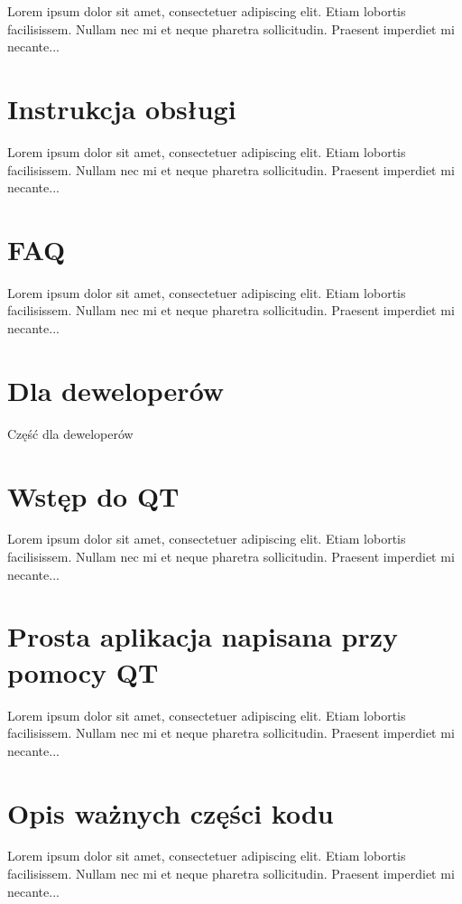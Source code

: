 \documentclass{article}
\begin{document}
Lorem ipsum dolor sit amet, consectetuer adipiscing elit.  
Etiam lobortis facilisissem.  Nullam nec mi et neque pharetra 
sollicitudin.  Praesent imperdiet mi necante...

\section{Instrukcja obsługi}
 
Lorem ipsum dolor sit amet, consectetuer adipiscing elit.  
Etiam lobortis facilisissem.  Nullam nec mi et neque pharetra 
sollicitudin.  Praesent imperdiet mi necante...

\section{FAQ}
 
Lorem ipsum dolor sit amet, consectetuer adipiscing elit.  
Etiam lobortis facilisissem.  Nullam nec mi et neque pharetra 
sollicitudin.  Praesent imperdiet mi necante...

\section*{Dla deweloperów}
 
Część dla deweloperów

\section{Wstęp do QT}
 
Lorem ipsum dolor sit amet, consectetuer adipiscing elit.  
Etiam lobortis facilisissem.  Nullam nec mi et neque pharetra 
sollicitudin.  Praesent imperdiet mi necante...

\section{Prosta aplikacja napisana przy pomocy QT}
 
Lorem ipsum dolor sit amet, consectetuer adipiscing elit.  
Etiam lobortis facilisissem.  Nullam nec mi et neque pharetra 
sollicitudin.  Praesent imperdiet mi necante...

\section{Opis ważnych części kodu}
 
Lorem ipsum dolor sit amet, consectetuer adipiscing elit.  
Etiam lobortis facilisissem.  Nullam nec mi et neque pharetra 
sollicitudin.  Praesent imperdiet mi necante...
\end{document}
